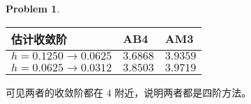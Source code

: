 \documentclass[a4paper]{article}
\theoremstyle{definition}
\newtheorem{problem}{Problem}
\theoremstyle{plain}
\newcommand{\<}{\left<}
\renewcommand{\>}{\right>}
\numberwithin{equation}{problem}
\begin{document}
\begin{problem}
\begin{tabular}{|l|l|l|}
\hline
\textbf{估计收敛阶} & \textbf{AB4} & \textbf{AM3} \\
\hline
$h=0.1250\to 0.0625$ & $3.6868$ & $3.9359$ \\
$h=0.0625\to 0.0312$ & $3.8503$ & $3.9719$ \\
\hline
\end{tabular}

可见两者的收敛阶都在 $4$ 附近，说明两者都是四阶方法。
\end{problem}
\end{document}
